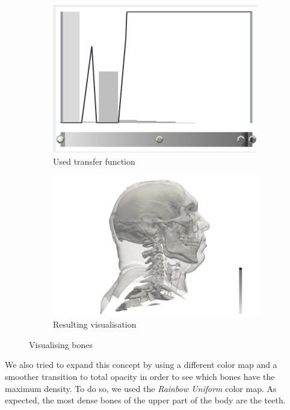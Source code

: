 \documentclass[openany]{article}
\begin{document}
\begin{figure}[h]
\centering
\begin{subfigure}{.45\textwidth}
  \centering
  \includegraphics[width=\linewidth]{VisHuman_Head/transfer_function_1}
  \caption{Used transfer function}
\end{subfigure}%
\begin{subfigure}{.5\textwidth}
  \centering
  \includegraphics[width=\linewidth]{VisHuman_Head/human_head_1}
  \caption{Resulting visualisation}
\end{subfigure}
\caption{Visualising bones}
\end{figure}

We also tried to expand this concept by using a different color map and a smoother transition to total opacity in order to see which bones have the maximum density. To do so, we used the \textit{Rainbow Uniform} color map. As expected, the most dense bones of the upper part of the body are the teeth.
\end{document}

